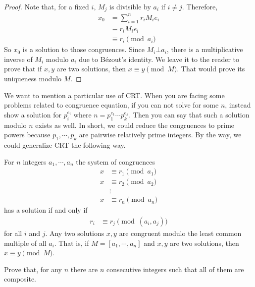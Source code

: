 \documentclass{subfile}
\begin{document}
		\begin{proof}
			Note that, for a fixed $i$, $M_j$ is divisible by $a_i$ if $i\neq j$. Therefore,
			\begin{align*}
			x_0
				& = \sum_{i=1}^{n} r_i M_ie_i\\
				& \equiv r_iM_ie_i\\
				& \equiv r_i\pmod{a_i}
			\end{align*}
			So $x_0$ is a solution to those congruences. Since $M_i\bot a_i$, there is a multiplicative inverse of $M_i$ modulo $a_i$ due to B\'{e}zout's identity. We leave it to the reader to prove that if $x,y$ are two solutions, then $x\equiv y\pmod M$. That would prove its uniqueness modulo $M$.
		\end{proof}
	We want to mention a particular use of CRT. When you are facing some problems related to congruence equation, if you can not solve for some $n$, instead show a solution for $p_i^{e_i}$ where $n=p_1^{e_1}\cdots p_k^{e_k}$. Then you can say that such a solution modulo $n$ exists as well. In short, we could reduce the congruences to prime powers because $p_1,\cdots,p_k$ are pairwise relatively prime integers. By the way, we could generalize CRT the following way.
		\begin{theorem}
			For $n$ integers $a_1,\cdots,a_n$ the system of congruences
			\begin{align*}
				x & \equiv r_1\pmod{a_1}\\
				x & \equiv r_2\pmod{a_2}\\
				&\vdots\\
				x & \equiv r_n\pmod{a_n}
			\end{align*}
			has a solution if and only if
			\begin{align*}
				r_i & \equiv r_j\pmod{(a_i,a_j)}
			\end{align*}
			for all $i$ and $j$. Any two solutions $x,y$ are congruent modulo the least common multiple of all $a_i$. That is, if $M=[a_1,\cdots,a_n]$ and $x,y$ are two solutions, then $x\equiv y\pmod M$.
		\end{theorem}

		\begin{problem}
			Prove that, for any $n$ there are $n$ consecutive integers such that all of them are composite.
		\end{problem}
\end{document}
